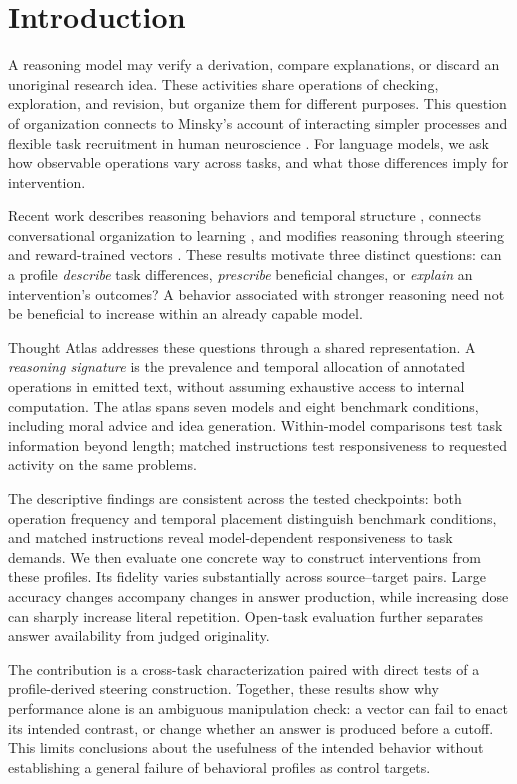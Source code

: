 \section{Introduction}
A reasoning model may verify a derivation, compare explanations, or discard an unoriginal research idea. These activities share operations of checking, exploration, and revision, but organize them for different purposes. This question of organization connects to Minsky's account of interacting simpler processes and flexible task recruitment in human neuroscience \citep{minsky1986society,cole2013hubs}. For language models, we ask how observable operations vary across tasks, and what those differences imply for intervention.

Recent work describes reasoning behaviors and temporal structure \citep{gandhi2025habits,chen2025lot,li2025thinkarm,lee2026reasonops}, connects conversational organization to learning \citep{kim2026society}, and modifies reasoning through steering and reward-trained vectors \citep{chen2025seal,sinii2025vectors}. These results motivate three distinct questions: can a profile \emph{describe} task differences, \emph{prescribe} beneficial changes, or \emph{explain} an intervention's outcomes? A behavior associated with stronger reasoning need not be beneficial to increase within an already capable model.

Thought Atlas addresses these questions through a shared representation. A \emph{reasoning signature} is the prevalence and temporal allocation of annotated operations in emitted text, without assuming exhaustive access to internal computation. The atlas spans seven models and eight benchmark conditions, including moral advice and idea generation. Within-model comparisons test task information beyond length; matched instructions test responsiveness to requested activity on the same problems.

The descriptive findings are consistent across the tested checkpoints: both operation frequency and temporal placement distinguish benchmark conditions, and matched instructions reveal model-dependent responsiveness to task demands. We then evaluate one concrete way to construct interventions from these profiles. Its fidelity varies substantially across source--target pairs. Large accuracy changes accompany changes in answer production, while increasing dose can sharply increase literal repetition. Open-task evaluation further separates answer availability from judged originality.

The contribution is a cross-task characterization paired with direct tests of a profile-derived steering construction. Together, these results show why performance alone is an ambiguous manipulation check: a vector can fail to enact its intended contrast, or change whether an answer is produced before a cutoff. This limits conclusions about the usefulness of the intended behavior without establishing a general failure of behavioral profiles as control targets.
